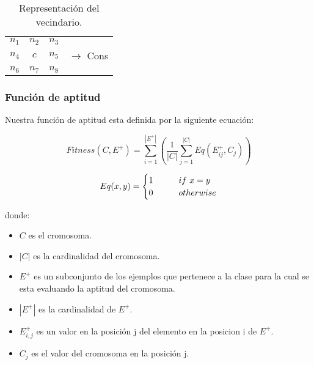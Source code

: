 \begin{table}[H]
	\begin{center}
		\begin{tabular}{ c c c c}
			$n_1$&$n_2$&$n_3$&\\
			$n_4$&$c$&$n_5$& $\rightarrow$ Cons\\
			$n_6$&$n_7$&$n_8$&\\
		\end{tabular}
	\end{center}
	\caption{\label{tab:caneigh} Representación del vecindario.}
\end{table}

\begin{table}[H]
	\begin{center}
	\end{center}
	\caption{\label{tab:representation} Representación del la codificación.}
\end{table}

\subsubsection{Función de aptitud}

Nuestra función de aptitud esta definida por la siguiente ecuación:

\[Fitness(C,E^{+})=\sum_{i=1}^{|E^{+}|} \left(\frac{1}{|C|}\sum_{j=1}^{|C|} Eq(E^{+}_{ij},C_{j}) \right)\]

\[
Eq(x,y)=
\begin{cases}
\text1 &\qquad if\ x=y \\
\text0 &\qquad otherwise
\end{cases}
\]

donde:
\begin{itemize}
	\item \(C\) es el cromosoma.
	\item \(|C|\) es la cardinalidad del cromosoma.
	\item \(E^{+}\) es un subconjunto de los ejemplos que pertenece a la clase para la cual se esta evaluando la aptitud del cromosoma.
	\item \(|E^{+}|\) es la cardinalidad de $E^+$.
	\item \(E^{+}_{i,j}\) es un valor en la posición j del elemento en la posicion i de $E^+$.
	\item \(C_{j}\) es el valor del cromosoma en la posición j.
\end{itemize}

